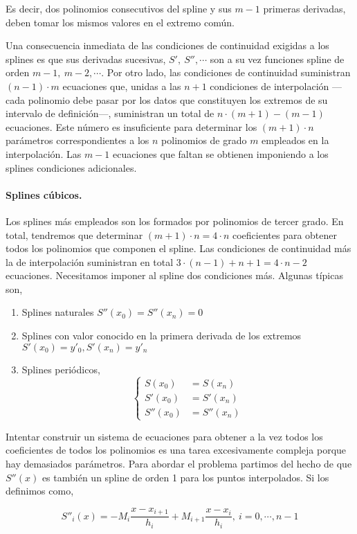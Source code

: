 \begin{paracol}{2}
Es decir, dos polinomios consecutivos del spline y sus $m-1$ primeras derivadas, deben tomar los mismos valores en el extremo común. 

Una consecuencia inmediata de las condiciones de continuidad exigidas a los splines es que sus derivadas sucesivas, $S',\ S'', \cdots$ son a su vez funciones spline de orden $m-1,\ m-2, \cdots$. Por otro lado, las condiciones de continuidad suministran  $(n-1)\cdot m$ ecuaciones que, unidas a las $n+1$ condiciones de interpolación ---cada polinomio debe pasar por los datos que constituyen los extremos de su intervalo de definición---,  suministran un total de  $n\cdot (m+1)-(m-1)$ ecuaciones. Este número es insuficiente para determinar los $(m+1)\cdot n$ parámetros correspondientes a los $n$ polinomios de grado $m$ empleados en la interpolación. Las $m-1$ ecuaciones que faltan se obtienen imponiendo a los splines condiciones adicionales.


\paragraph{Splines cúbicos.}  Los splines más empleados son los formados por polinomios de tercer grado. En total, tendremos que determinar $(m+1)\cdot n=4\cdot n$ coeficientes para obtener todos los polinomios que componen el spline. Las condiciones de continuidad más la de interpolación suministran en total $3\cdot (n-1)+n+1=4\cdot n-2$  ecuaciones. Necesitamos imponer al spline dos condiciones más. Algunas típicas son,
\begin{enumerate}
\item Splines naturales $S''(x_0)=S''(x_n)=0$
\item Splines con valor conocido en la primera derivada de los extremos $S'(x_0)=y'_0, S'(x_n)=y'_n$
\item Splines periódicos,
\begin{equation*}
\left\{ 
\begin{aligned}
S(x_0)&=S(x_n)\\
S'(x_0)&=S'(x_n)\\
S''(x_0)&=S''(x_n)
\end{aligned}
\right.
\end{equation*}
\end{enumerate}

Intentar construir un sistema de ecuaciones para obtener a la vez todos los coeficientes de todos los polinomios es una tarea excesivamente compleja porque hay demasiados parámetros.  Para abordar el problema partimos del hecho de que $S''(x)$ es también un spline de orden 1 para los puntos interpolados. Si los definimos como,
\end{paracol}
\begin{equation*}
S''_i(x)=-M_i\frac{x-x_{i+1}}{h_i}+M_{i+1}\frac{x-x_i}{h_i},\   i=0,\cdots, n-1
\end{equation*}

